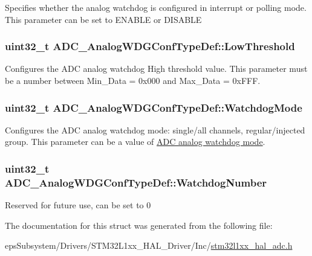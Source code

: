 Specifies whether the analog watchdog is configured in interrupt or polling mode. This parameter can be set to E\-N\-A\-B\-L\-E or D\-I\-S\-A\-B\-L\-E \hypertarget{struct_a_d_c___analog_w_d_g_conf_type_def_a77e1743ebd27333ac2c9de55a25cd4c8}{
\subsubsection[{Low\-Threshold}]{\setlength{\rightskip}{0pt plus 5cm}uint32\-\_\-t A\-D\-C\-\_\-\-Analog\-W\-D\-G\-Conf\-Type\-Def\-::\-Low\-Threshold}}\label{struct_a_d_c___analog_w_d_g_conf_type_def_a77e1743ebd27333ac2c9de55a25cd4c8}
Configures the A\-D\-C analog watchdog High threshold value. This parameter must be a number between Min\-\_\-\-Data = 0x000 and Max\-\_\-\-Data = 0x\-F\-F\-F. \hypertarget{struct_a_d_c___analog_w_d_g_conf_type_def_ad4c60783321a30e8edffa323148e424d}{
\subsubsection[{Watchdog\-Mode}]{\setlength{\rightskip}{0pt plus 5cm}uint32\-\_\-t A\-D\-C\-\_\-\-Analog\-W\-D\-G\-Conf\-Type\-Def\-::\-Watchdog\-Mode}}\label{struct_a_d_c___analog_w_d_g_conf_type_def_ad4c60783321a30e8edffa323148e424d}
Configures the A\-D\-C analog watchdog mode\-: single/all channels, regular/injected group. This parameter can be a value of \hyperlink{group___a_d_c__analog__watchdog__mode}{A\-D\-C analog watchdog mode}. \hypertarget{struct_a_d_c___analog_w_d_g_conf_type_def_a025e81af21b93c5b8daf9f5241383302}{
\subsubsection[{Watchdog\-Number}]{\setlength{\rightskip}{0pt plus 5cm}uint32\-\_\-t A\-D\-C\-\_\-\-Analog\-W\-D\-G\-Conf\-Type\-Def\-::\-Watchdog\-Number}}\label{struct_a_d_c___analog_w_d_g_conf_type_def_a025e81af21b93c5b8daf9f5241383302}
Reserved for future use, can be set to 0 

The documentation for this struct was generated from the following file\-:\begin{DoxyCompactItemize}
\item 
eps\-Subsystem/\-Drivers/\-S\-T\-M32\-L1xx\-\_\-\-H\-A\-L\-\_\-\-Driver/\-Inc/\hyperlink{stm32l1xx__hal__adc_8h}{stm32l1xx\-\_\-hal\-\_\-adc.\-h}\end{DoxyCompactItemize}
